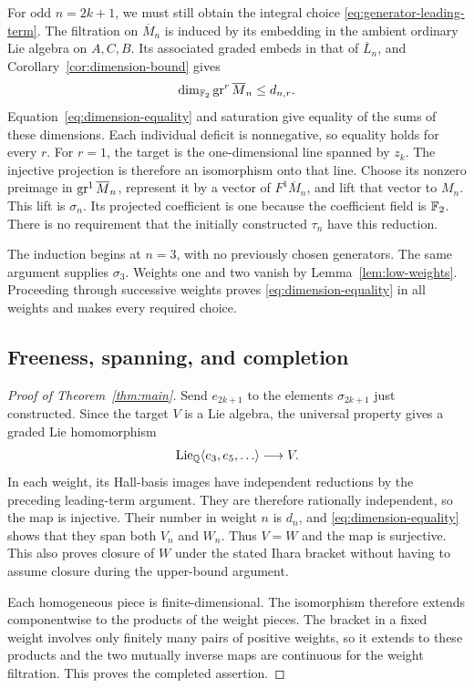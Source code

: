 For odd \(n=2k+1\), we must still obtain the integral choice
\eqref{eq:generator-leading-term}.
The filtration on \(\overline M_n\) is induced by its embedding in
the ambient ordinary Lie algebra on \(A,C,B\).  Its associated
graded embeds in that of \(\overline L_n\), and
Corollary~\ref{cor:dimension-bound} gives
\[
 \dim_{\mathbb F_2}\operatorname{gr}^r\overline M_n\le d_{n,r}.
\]
Equation~\eqref{eq:dimension-equality} and saturation give equality
of the sums of these dimensions.  Each individual deficit is
nonnegative, so equality holds for every \(r\).
For \(r=1\), the target is the one-dimensional line spanned by
\(z_k\).  The injective projection is therefore an isomorphism
onto that line.
Choose its nonzero preimage in \(\operatorname{gr}^1\overline M_n\), represent
it by a vector of \(F^1\overline M_n\), and lift that vector to
\(M_n\).  This lift is \(\sigma_n\).  Its projected coefficient
is one because the coefficient field is \({\mathbb F_2}\).
There is no requirement that the initially constructed
\(\tau_n\) have this reduction.

The induction begins at \(n=3\), with no previously chosen
generators.  The same argument supplies \(\sigma_3\).
Weights one and two vanish by Lemma~\ref{lem:low-weights}.
Proceeding through successive weights proves
\eqref{eq:dimension-equality} in all weights and makes every
required choice.

\subsection{Freeness, spanning, and completion}
\begin{proof}[Proof of Theorem~\ref{thm:main}]
\label{thm:main-proof}
Send \(e_{2k+1}\) to the elements \(\sigma_{2k+1}\) just
constructed.  Since the target \(V\) is a Lie algebra, the
universal property gives a graded Lie homomorphism
\[
 \operatorname{Lie}_\mathbb Q\langle e_3,e_5,\ldots\rangle\longrightarrow V.
\]
In each weight, its Hall-basis images have independent
reductions by the preceding leading-term argument.  They are
therefore rationally independent, so the map is injective.
Their number in weight \(n\) is \(d_n\), and
\eqref{eq:dimension-equality} shows that they span both \(V_n\)
and \(W_n\).  Thus \(V=W\) and the map is surjective.
This also proves closure of \(W\) under the stated Ihara bracket
without having to assume closure during the upper-bound argument.

Each homogeneous piece is finite-dimensional.  The isomorphism
therefore extends componentwise to the products of the weight
pieces.  The bracket in a fixed weight involves only finitely
many pairs of positive weights, so it extends to these products
and the two mutually inverse maps are continuous for the weight
filtration.  This proves the completed assertion.
\end{proof}
